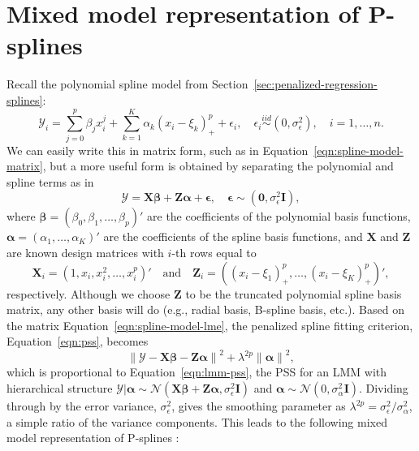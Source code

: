 \documentclass[cmfont,usenames,dvipsnames,leqno]{afit-etd}\usepackage[]{graphicx}\usepackage[]{color}
\newcommand{\norm}[1]{\left\|#1\right\|}
\newcommand{\bc}[1]{\ensuremath{\bm{\mathcal{#1}}}}
\newcommand{\mc}[1]{\ensuremath{\mathcal{#1}}}
\begin{document}
\section{Mixed model representation of P-splines}
\label{sec:pspline-lmm}
Recall the polynomial spline model from Section~\ref{sec:penalized-regression-splines}:
\begin{equation}
  \mc{Y}_i = \sum_{j = 0}^p\beta_jx_i^j + \sum_{k = 1}^K \alpha_k\left(x_i - \xi_k\right)_+^p + \epsilon_i, \quad \epsilon_i \stackrel{iid}{\sim} \left(0, \sigma_\epsilon^2\right), \quad i = 1, \dotsc, n.
\end{equation}
We can easily write this in matrix form, such as in Equation~\eqref{eqn:spline-model-matrix}, but a more useful form is obtained by separating the polynomial and spline terms as in
\begin{equation}
\label{eqn:spline-model-lme}
  \bc{Y} = \bm{X}\bm{\beta} + \bm{Z}\bm{\alpha} + \bm{\epsilon}, \quad \bm{\epsilon} \sim \left(\bm{0}, \sigma_\epsilon^2\bm{I}\right),
\end{equation}
where $\bm{\beta} = (\beta_0, \beta_1, \dotsc, \beta_p)'$ are the coefficients of the polynomial basis functions, $\bm{\alpha} = (\alpha_1, \dotsc, \alpha_K)'$ are the coefficients of the spline basis functions, and $\bm{X}$ and $\bm{Z}$ are known design matrices with $i$-th rows equal to
\begin{equation*}
\bm{X}_i = \left(1, x_i, x_i^2, \dotsc, x_i^p \right)' \quad \text{and} \quad  \bm{Z}_i = \left( (x_i - \xi_1)_+^p, \dotsc, (x_i - \xi_K)_+^p \right)',
\end{equation*}
respectively. Although we choose $\bm{Z}$ to be the truncated polynomial spline basis matrix, any other basis will do (e.g., radial basis, B-spline basis, etc.). Based on the matrix Equation~\eqref{eqn:spline-model-lme}, the penalized spline fitting criterion, Equation~\eqref{eqn:pss}, becomes
\begin{equation*}
  \norm{\bc{Y} - \bm{X}\bm{\beta} - \bm{Z}\bm{\alpha}}^2 + \lambda^{2p}\norm{\bm{\alpha}}^2,
\end{equation*}
which is proportional to Equation~\eqref{eqn:lmm-pss}, the PSS for an \ac{LMM} with hierarchical structure $\bc{Y}|\bm{\alpha} \sim \mc{N}(\bm{X}\bm{\beta} + \bm{Z}\bm{\alpha}, \sigma_\epsilon^2\bm{I})$ and $\bm{\alpha} \sim \mc{N}(0, \sigma_\alpha^2\bm{I})$. Dividing through by the error variance, $\sigma_\epsilon^2$, gives the smoothing parameter as $\lambda^{2p} = \sigma_\epsilon^2/\sigma_\alpha^2$, a simple ratio of the variance components. This leads to the following mixed model representation of \ac{P-spline}s \citep{brumback_comment_1999}:
\end{document}
